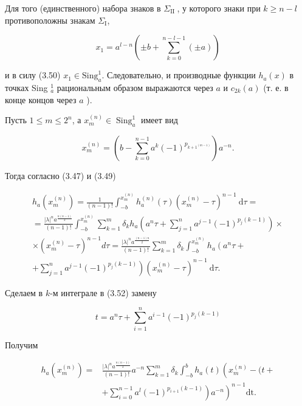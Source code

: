 \documentclass[10pt]{article}
\begin{document}
Для того (единственного) набора знаков в $\Sigma_{\text {II }}$, у которого знаки при $k \geqslant n-l$ противоположны знакам $\Sigma_{\mathrm{I}}$,

$$
x_{1}=a^{l-n}\left( \pm b+\sum_{k=0}^{n-l-1}( \pm a)\right)
$$

и в силу (3.50) $x_{1} \in \mathrm{Sing}_{a}^{1}$. Следовательно, и производные функции $h_{a}(x)$ в точках Sing ${ }_{a}^{1}$ рациональным образом выражаются через $a$ и $c_{2 k}(a)$ (т. е. в конце концов через $a$ ).

Пусть $1 \leqslant m \leqslant 2^{n}$, а $x_{m}^{(n)} \in \operatorname{Sing}_{a}^{1}$ имеет вид


\begin{equation*}
x_{m}^{(n)}=\left(b-\sum_{k=0}^{n-1} a^{k}(-1)^{p_{k+1^{(m-1)}}}\right) a^{-n} . \tag{3.51}
\end{equation*}


Тогда согласно (3.47) и (3.49)


\begin{gather*}
h_{a}\left(x_{m}^{(n)}\right)=\frac{1}{(n-1)!} \int_{-b}^{x_{m}^{(n)}} h_{a}^{(n)}(\tau)\left(x_{m}^{(n)}-\tau\right)^{n-1} \mathrm{~d} \tau= \\
=\frac{|\lambda|^{n} a^{\frac{n(n-1)}{2}}}{(n-1)!} \int_{-b}^{x_{m}^{(n)}} \sum_{k=1}^{m} \delta_{k} h_{a}\left(a^{n} \tau+\sum_{j=1}^{n} a^{j-1}(-1)^{p_{j}(k-1)}\right) \times \\
\times\left(x_{m}^{(n)}-\tau\right)^{n-1} d \tau=\frac{|\lambda|^{n} a^{\frac{(n-1) n}{2}}}{(n-1)!} \sum_{k=1}^{m} \delta_{k} \int_{-b}^{x_{m}^{(n)}} h_{a}\left(a^{n} \tau+\right. \\
\left.+\sum_{j=1}^{n} a^{j-1}(-1)^{p_{j}(k-1)}\right)\left(x_{m}^{(n)}-\tau\right)^{n-1} \mathrm{~d} \tau . \tag{3.52}
\end{gather*}


Сделаем в $k$-м интеграле в (3.52) замену

$$
t=a^{n} \tau+\sum_{i=1}^{n} a^{i-1}(-1)^{p_{j}(k-1)}
$$

Получим


\begin{align*}
h_{a}\left(x_{m}^{(n)}\right)= & \frac{|\lambda|^{n} a^{\frac{n(n-1)}{2}}}{(n-1)!} a^{-n} \sum_{k=1}^{m} \delta_{k} \int_{-b}^{b} h_{a}(t)\left(x_{m}^{(n)}-(t+\right. \\
& \left.\left.+\sum_{i=0}^{n-1} a^{l}(-1)^{p_{i+1}(k-1)}\right) a^{-n}\right)^{n-1} \mathrm{dt} . \tag{3.53}
\end{align*}
\end{document}
